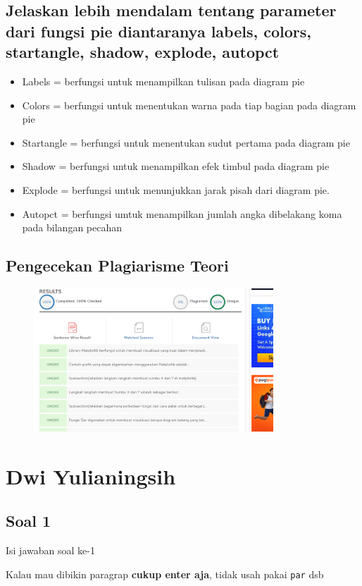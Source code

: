\subsection{Jelaskan lebih mendalam tentang parameter dari fungsi pie diantaranya labels, colors, startangle, shadow, explode, autopct}
\begin{itemize}
    \item Labels = berfungsi untuk menampilkan tulisan pada diagram pie
    \item Colors = berfungsi untuk menentukan warna pada tiap bagian pada diagram pie
    \item Startangle = berfungsi untuk menentukan sudut pertama pada diagram pie
    \item Shadow = berfungsi untuk menampilkan efek timbul pada diagram pie
    \item Explode = berfungsi untuk menunjukkan jarak pisah dari diagram pie.
    \item Autopct = berfungsi umtuk menampilkan jumlah angka dibelakang koma pada bilangan pecahan
\end{itemize}

\subsection{Pengecekan Plagiarisme Teori}
\begin{figure}[H]
	\includegraphics[width=9cm]{figures/6/Teori/1174096/Plagiat.png}
	\centering
\end{figure}

\section{Dwi Yulianingsih}
\subsection{Soal 1}
Isi jawaban soal ke-1

Kalau mau dibikin paragrap \textbf{cukup enter aja}, tidak usah pakai \verb|par| dsb

